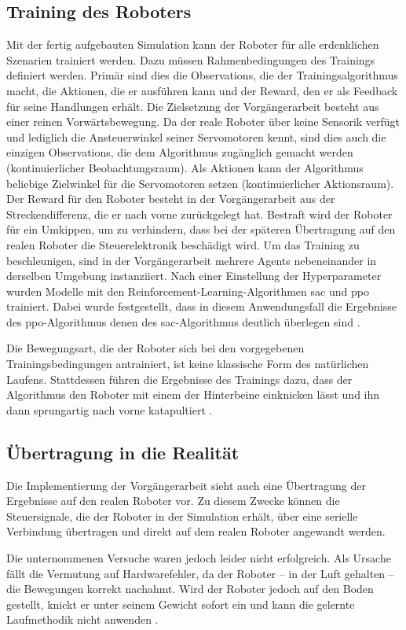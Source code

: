 \subsection{Training des Roboters}
Mit der fertig aufgebauten Simulation kann der Roboter für alle erdenklichen Szenarien trainiert werden.
Dazu müssen Rahmenbedingungen des Trainings definiert werden.
Primär sind dies die Observations, die der Trainingsalgorithmus macht, die Aktionen, die er ausführen kann und der Reward, den er als Feedback für seine Handlungen erhält.
Die Zielsetzung der Vorgängerarbeit besteht aus einer reinen Vorwärtsbewegung.
Da der reale Roboter über keine Sensorik verfügt und lediglich die Ansteuerwinkel seiner Servomotoren kennt, sind dies auch die einzigen Observations, die dem Algorithmus zugänglich gemacht werden (kontinuierlicher Beobachtungsraum).
Als Aktionen kann der Algorithmus beliebige Zielwinkel für die Servomotoren setzen (kontinuierlicher Aktionsraum).
Der Reward für den Roboter besteht in der Vorgängerarbeit aus der Streckendifferenz, die er nach vorne zurückgelegt hat.
Bestraft wird der Roboter für ein Umkippen, um zu verhindern, dass bei der späteren Übertragung auf den realen Roboter die Steuerelektronik beschädigt wird.
Um das Training zu beschleunigen, sind in der Vorgängerarbeit mehrere Agents nebeneinander in derselben Umgebung instanziiert.
Nach einer Einstellung der Hyperparameter wurden Modelle mit den Reinforcement-Learning-Algorithmen \ac{sac} und \ac{ppo} trainiert.
Dabei wurde festgestellt, dass in diesem Anwendungsfall die Ergebnisse des \ac{ppo}-Algorithmus denen des \ac{sac}-Algorithmus deutlich überlegen sind \cite[48]{waidner.2020}.

Die Bewegungsart, die der Roboter sich bei den vorgegebenen Trainingsbedingungen antrainiert, ist keine klassische Form des natürlichen Laufens.
Stattdessen führen die Ergebnisse des Trainings dazu, dass der Algorithmus den Roboter mit einem der Hinterbeine einknicken lässt und ihn dann sprungartig nach vorne katapultiert \cite[51]{waidner.2020}.

\subsection{Übertragung in die Realität}
Die Implementierung der Vorgängerarbeit sieht auch eine Übertragung der Ergebnisse auf den realen Roboter vor.
Zu diesem Zwecke können die Steuersignale, die der Roboter in der Simulation erhält, über eine serielle Verbindung übertragen und direkt auf dem realen Roboter angewandt werden.

Die unternommenen Versuche waren jedoch leider nicht erfolgreich.
Als Ursache fällt die Vermutung auf Hardwarefehler, da der Roboter -- in der Luft gehalten -- die Bewegungen korrekt nachahmt.
Wird der Roboter jedoch auf den Boden gestellt, knickt er unter seinem Gewicht sofort ein und kann die gelernte Laufmethodik nicht anwenden \cite[58]{waidner.2020}.
